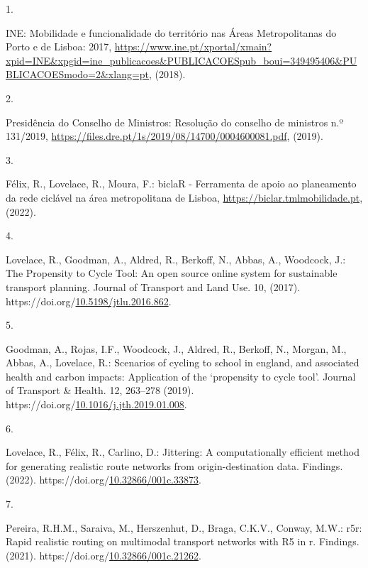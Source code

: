 \documentclass[runningheads]{llncs}
\newlength{\cslhangindent}
\newlength{\csllabelwidth}
\newlength{\cslentryspacingunit} %
\newenvironment{CSLReferences}[2] %
 {%
  \setlength{\parindent}{0pt}
  \ifodd #1
  \let\oldpar\par
  \def\par{\hangindent=\cslhangindent\oldpar}
  \fi
  \setlength{\parskip}{#2\cslentryspacingunit}
 }%
 {}
\newcommand{\CSLLeftMargin}[1]{\parbox[t]{\csllabelwidth}{#1}}
\newcommand{\CSLRightInline}[1]{\parbox[t]{\linewidth - \csllabelwidth}{#1}\break}
\begin{document}
\hypertarget{refs}{}
\begin{CSLReferences}{0}{0}
\leavevmode{}%
\CSLLeftMargin{1. }%
\CSLRightInline{INE: Mobilidade e funcionalidade do território nas
{Áreas Metropolitanas do Porto e de Lisboa}: 2017,
\url{https://www.ine.pt/xportal/xmain?xpid=INE\&xpgid=ine_publicacoes\&PUBLICACOESpub_boui=349495406\&PUBLICACOESmodo=2\&xlang=pt},
(2018).}

\leavevmode{}%
\CSLLeftMargin{2. }%
\CSLRightInline{Presidência do Conselho de Ministros: Resolução do
conselho de ministros n.º 131/2019,
\url{https://files.dre.pt/1s/2019/08/14700/0004600081.pdf}, (2019).}

\leavevmode{}%
\CSLLeftMargin{3. }%
\CSLRightInline{Félix, R., Lovelace, R., Moura, F.: {biclaR - Ferramenta
de apoio ao planeamento da rede ciclável na área metropolitana de
Lisboa}, \url{https://biclar.tmlmobilidade.pt}, (2022).}

\leavevmode{}%
\CSLLeftMargin{4. }%
\CSLRightInline{Lovelace, R., Goodman, A., Aldred, R., Berkoff, N.,
Abbas, A., Woodcock, J.: The Propensity to Cycle Tool: An open source
online system for sustainable transport planning. Journal of Transport
and Land Use. 10, (2017).
https://doi.org/\href{https://doi.org/10.5198/jtlu.2016.862}{10.5198/jtlu.2016.862}.}

\leavevmode{}%
\CSLLeftMargin{5. }%
\CSLRightInline{Goodman, A., Rojas, I.F., Woodcock, J., Aldred, R.,
Berkoff, N., Morgan, M., Abbas, A., Lovelace, R.: Scenarios of cycling
to school in england, and associated health and carbon impacts:
Application of the {`}propensity to cycle tool{'}. Journal of Transport
\& Health. 12, 263--278 (2019).
https://doi.org/\href{https://doi.org/10.1016/j.jth.2019.01.008}{10.1016/j.jth.2019.01.008}.}

\leavevmode{}%
\CSLLeftMargin{6. }%
\CSLRightInline{Lovelace, R., Félix, R., Carlino, D.: Jittering: A
computationally efficient method for generating realistic route networks
from origin-destination data. Findings. (2022).
https://doi.org/\href{https://doi.org/10.32866/001c.33873}{10.32866/001c.33873}.}

\leavevmode{}%
\CSLLeftMargin{7. }%
\CSLRightInline{Pereira, R.H.M., Saraiva, M., Herszenhut, D., Braga,
C.K.V., Conway, M.W.: r5r: Rapid realistic routing on multimodal
transport networks with R5 in r. Findings. (2021).
https://doi.org/\href{https://doi.org/10.32866/001c.21262}{10.32866/001c.21262}.}


\end{CSLReferences}
\end{document}

